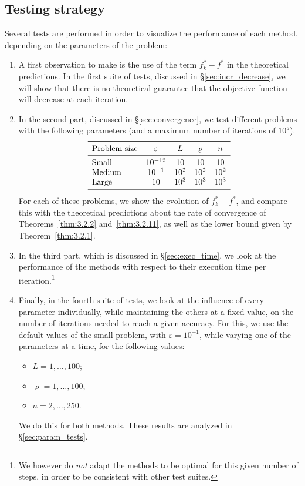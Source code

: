 \documentclass[final]{aomart}
\newtheorem[{}\it]{thm}{Theorem}[section]
\theoremstyle{definition}
\newtheorem*[{}\it]{notation}{Notation}
\numberwithin{equation}{section}
\newcommand{\thmref}[1]{Theorem~\ref{#1}}
\newcommand{\secref}[1]{\S\ref{#1}}
\renewcommand{\epsilon}{\varepsilon}
\renewcommand{\rho}{\varrho}
\begin{document}
\subsection{Testing strategy}
Several tests are performed in order to visualize the performance of each method, depending on the parameters of the problem:
\begin{enumerate}
	\item A first observation to make is the use of the term \(f^*_k - f^*\) in the theoretical predictions.
	In the first suite of tests, discussed in \secref{sec:incr_decrease}, we will show that there is no theoretical guarantee that the objective function will decrease at each iteration.
	\item In the second part, discussed in \secref{sec:convergence}, we test different problems with the following parameters (and a maximum number of iterations of \(10^5\)).
	\[
	\begin{array}{lcccc}
	\toprule
	\textnormal{Problem size} & \epsilon & L & \rho & n\\
	\midrule
	\textnormal{Small} & 10^{-12} & 10 & 10 & 10\\
	\textnormal{Medium} & 10^{-1} & 10^2 & 10^2 & 10^2\\
	\textnormal{Large} & 10 & 10^3 & 10^3 & 10^3\\
	\bottomrule
	\end{array}
	\]
	For each of these problems, we show the evolution of \(f^*_k - f^*\), and compare this with the theoretical predictions about the rate of convergence of Theorems~\ref{thm:3.2.2} and~\ref{thm:3.2.11}, as well as the lower bound given by \thmref{thm:3.2.1}.
	\item In the third part, which is discussed in \secref{sec:exec_time}, we look at the performance of the methods with respect to their execution time per iteration.\footnote{We however do \emph{not} adapt the methods to be optimal for this given number of steps, in order to be consistent with other test suites.}
	\item Finally, in the fourth suite of tests, we look at the influence of every parameter individually, while maintaining the others at a fixed value, on the number of iterations needed to reach a given accuracy.
	For this, we use the default values of the small problem, with \(\epsilon = 10^{-1}\), while varying one of the parameters at a time, for the following values:
	\begin{itemize}
		\item \(L = 1, \dots, 100\);
		\item \(\rho = 1, \dots, 100\);
		\item \(n = 2, \dots, 250\).
	\end{itemize}
	We do this for both methods.
	These results are analyzed in \secref{sec:param_tests}.
\end{enumerate}
\end{document}
